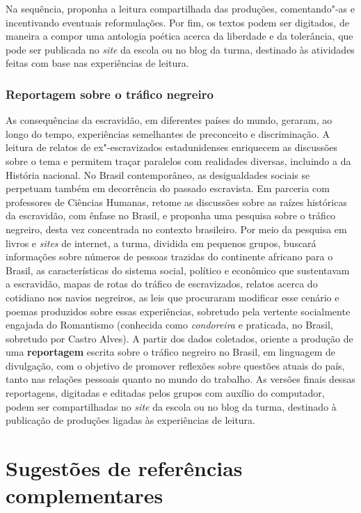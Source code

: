 \documentclass[12pt]{extarticle}
\begin{document}
Na sequência, proponha a leitura compartilhada das produções,
comentando"-as e incentivando eventuais reformulações. Por fim, os
textos podem ser digitados, de maneira a compor uma antologia poética
acerca da liberdade e da tolerância, que pode ser publicada no
\emph{site} da escola ou no blog da turma, destinado às atividades
feitas com base nas experiências de leitura.

\subsubsection{Reportagem sobre o tráfico negreiro}


As consequências da escravidão, em diferentes países do mundo,
geraram, ao longo do tempo, experiências semelhantes de preconceito e
discriminação. A leitura de relatos de ex"-escravizados estadunidenses
enriquecem as discussões sobre o tema e permitem traçar paralelos com
realidades diversas, incluindo a da História nacional. No Brasil
contemporâneo, as desigualdades sociais se perpetuam também em
decorrência do passado escravista. Em parceria com professores de
Ciências Humanas, retome as discussões sobre as raízes históricas da
escravidão, com ênfase no Brasil, e proponha uma pesquisa sobre o
tráfico negreiro, desta vez concentrada no contexto brasileiro. Por
meio da pesquisa em livros e \emph{sites} de internet, a turma,
dividida em pequenos grupos, buscará informações sobre números de
pessoas trazidas do continente africano para o Brasil, as
características do sistema social, político e econômico que
sustentavam a escravidão, mapas de rotas do tráfico de escravizados,
relatos acerca do cotidiano nos navios negreiros, as leis que
procuraram modificar esse cenário e poemas produzidos sobre essas
experiências, sobretudo pela vertente socialmente engajada do
Romantismo (conhecida como \emph{condoreira} e praticada, no Brasil,
sobretudo por Castro Alves). A partir dos dados coletados, oriente a
produção de uma \textbf{reportagem} escrita sobre o tráfico negreiro
no Brasil, em linguagem de divulgação, com o objetivo de promover
reflexões sobre questões atuais do país, tanto nas relações pessoais
quanto no mundo do trabalho. As versões finais dessas reportagens,
digitadas e editadas pelos grupos com auxílio do computador, podem ser
compartilhadas no \emph{site} da escola ou no blog da turma, destinado
à publicação de produções ligadas às experiências de leitura.


\section{Sugestões de referências complementares}\label{sugestoes}
\end{document}
